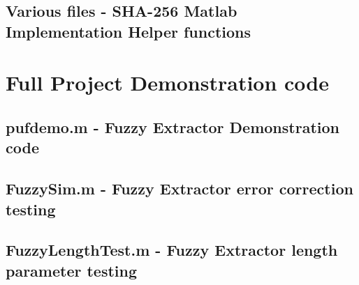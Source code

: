 \newpage

\subsection{Various files - SHA-256 Matlab Implementation Helper functions}












\newpage

\section{Full Project Demonstration code}
\label{app:demo}

\subsection{pufdemo.m - Fuzzy Extractor Demonstration code}



\newpage

\subsection{FuzzySim.m - Fuzzy Extractor error correction testing}



\newpage

\subsection{FuzzyLengthTest.m - Fuzzy Extractor length parameter testing}



